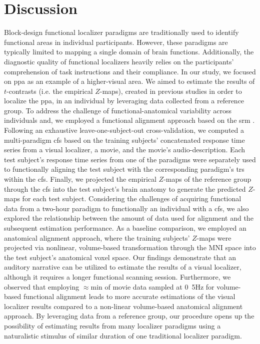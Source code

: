\section{Discussion}

%
Block-design functional localizer paradigms are traditionally used to identify
functional areas in individual participants.
%
However, these paradigms are typically limited to mapping a single domain of
brain functions.
%
Additionally, the diagnostic quality of functional localizers heavily relies on
the participants' comprehension of task instructions and their compliance.
%
In our study, we focused on \ac{ppa} as an example of a higher-visual area.
%
We aimed to estimate the results of $t$-contrasts (i.e. the empirical $Z$-maps),
created in previous studies \citep{sengupta2016extension,
haeusler2022processing} in order to localize the \ac{ppa}, in an individual by
leveraging data collected from a reference group.
%
To address the challenge of functional-anatomical variability across individuals
and, we employed a functional alignment approach based on the \acf{srm}
\citep{chen2015reduced}.
%
Following an exhaustive leave-one-subject-out cross-validation, we computed a
multi-paradigm \acf{cfs} based on the training subjects' concatenated response
time series from a visual localizer, a movie, and the movie's audio-description.
%
Each test subject's response time series from one of the paradigms were
separately used to functionally aligning the test subject with the corresponding
paradigm's \acp{tr} within the \ac{cfs}.
%
Finally, we projected the empirical $Z$-maps of the reference group through the
\ac{cfs} into the test subject's brain anatomy to generate the predicted
$Z$-maps for each test subject.
%
Considering the challenges of acquiring functional data from a two-hour paradigm
to functionally an individual with a \ac{cfs}, we also explored the relationship
between the amount of data used for alignment and the subsequent estimation
performance.
%
As a baseline comparison, we employed an anatomical alignment approach, where
the training subjects' $Z$-maps were projected via nonlinear, volume-based
transformation through the MNI space into the test subject's anatomical voxel
space.
%
Our findings demonstrate that an auditory narrative can be utilized to estimate
the results of a visual localizer, although it requires a longer functional
scanning session.
%
Furthermore, we observed that employing $\approx$\unit[15]{min} of movie data
sampled at \unit{0.5}{Hz} for volume-based functional alignment leads to more
accurate estimations of the visual localizer results compared to a non-linear
volume-based anatomical alignment approach.
%
By leveraging data from a reference group, our procedure opens up the
possibility of estimating results from many localizer paradigms using a
naturalistic stimulus of similar duration of one traditional localizer paradigm.



